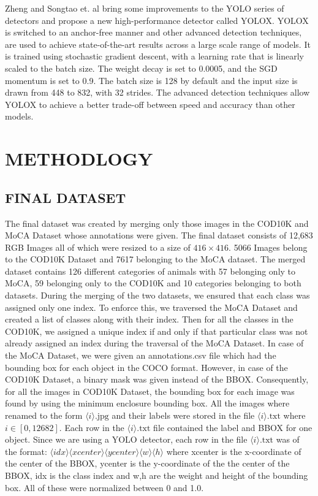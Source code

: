 \documentclass[conference]{IEEEtran}
\begin{document}
Zheng and Songtao et. al \cite{6} bring some improvements to the YOLO series of detectors and propose a new high-performance detector called YOLOX. YOLOX is switched to an anchor-free manner and other advanced detection techniques, are used to achieve state-of-the-art results across a large scale range of models. It is trained using stochastic gradient descent, with a learning rate that is linearly scaled to the batch size. The weight decay is set to 0.0005, and the SGD momentum is set to 0.9. The batch size is 128 by default and the input size is drawn from 448 to 832, with 32 strides. The advanced detection techniques allow YOLOX to achieve a better trade-off between speed and accuracy than other models.





\section{METHODLOGY}
\subsection{FINAL DATASET}
The final dataset was created by merging only those images in the COD10K and MoCA Dataset whose annotations were given. The final dataset consists of 12,683 RGB Images all of which were resized to a size of $416 \times 416$. 5066 Images belong to the COD10K Dataset and 7617 belonging to the MoCA dataset. The merged dataset contains 126 different categories of animals with 57 belonging only to MoCA, 59 belonging only to the COD10K and 10 categories belonging to both datasets. During the merging of the two datasets, we ensured that each class was assigned only one index. To enforce this, we traversed the MoCA Dataset and created a list of classes along with their index. Then for all the classes in the COD10K, we assigned a unique index if and only if that particular class was not already assigned an index during the traversal of the MoCA Dataset. In case of the MoCA Dataset, we were given an annotations.csv file which had the bounding box for each object in the COCO format. However, in case of the COD10K Dataset, a binary mask was given instead of the BBOX. Consequently, for all the images in COD10K Dataset, the bounding box for each image was found by using the minimum enclosure bounding box. All the images where renamed to the form $\langle i \rangle \text{.jpg}$ and their labels were stored in the file $\langle i \rangle \text{.txt}$ where $ i \in [0,12682]$.   Each row in the $\langle i \rangle \text{.txt}$ file contained the label and BBOX for one object. Since we are using a YOLO detector, each row in the file $\langle i \rangle \text{.txt}$ was of the format: $\langle idx \rangle \langle xcenter \rangle \langle ycenter \rangle \langle w \rangle \langle h \rangle$ where xcenter is the x-coordinate of the center of the BBOX, ycenter is the y-coordinate of the the center of the BBOX, idx is the class index and w,h are the weight and height of the bounding box. All of these were normalized between 0 and 1.0.  
\end{document}
